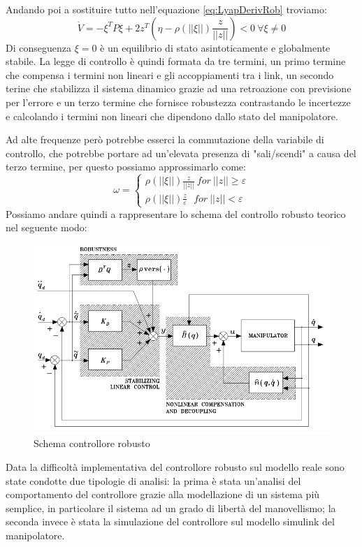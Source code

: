 Andando poi a sostituire tutto nell'equazione \ref{eq:LyapDerivRob} troviamo:
\begin{equation}
\dot{V} = -\xi^T P \xi + 2z^T(\eta-\rho(||\xi||) \frac{z}{||z||}) <0 \ \forall
\xi \neq 0
\end{equation}
Di conseguenza $\xi = 0$ è un equilibrio di stato asintoticamente e globalmente stabile. La legge di controllo è quindi formata da tre termini, un primo termine che compensa i termini non lineari e gli accoppiamenti tra i link, un secondo terine che stabilizza il sistema dinamico grazie ad una retroazione con previsione per l'errore e un terzo termine che fornisce robustezza contrastando le incertezze e calcolando i termini non lineari che dipendono dallo stato del manipolatore. 
\par Ad alte frequenze però potrebbe esserci la commutazione della variabile di controllo, che potrebbe portare ad un'elevata presenza di "sali/scendi" a causa del terzo termine, per questo possiamo approssimarlo come:
\begin{equation}
\omega = \begin{cases}
\rho(||\xi||) \frac{z}{||z||} \ for\ ||z||\ge \varepsilon \\
\rho(||\xi||) \frac{z}{\varepsilon} \ \ \ for \ ||z|| < \varepsilon
\end{cases}
\end{equation}
Possiamo andare quindi a rappresentare lo schema del controllo robusto teorico nel seguente modo:
\begin{figure}[ht]
	\begin{center}
		\includegraphics[scale=0.8]{Immagini/Controllori/RobustTeoria}
		\caption{Schema controllore robusto}
		\label{fig:RobustSchema}
	\end{center}
\end{figure}
Data la difficoltà implementativa del controllore robusto sul modello reale sono state condotte due tipologie di analisi: la prima è stata un'analisi del comportamento del controllore grazie alla modellazione di un sistema più semplice, in particolare il sistema ad un grado di libertà del manovellismo; la seconda invece è stata la simulazione del controllore sul modello simulink del manipolatore.
